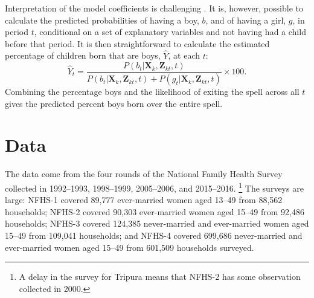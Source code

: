 \documentclass[12pt,letterpaper]{article}
\begin{document}
Interpretation of the model coefficients is challenging \citep{thomas96}.
It is, however, possible to calculate the predicted probabilities of 
having a boy, $b$, and of having a girl, $g$, in period $t$, conditional on 
a set of explanatory variables and not having had a child before that period.
It is then straightforward to calculate the estimated percentage of children born that 
are boys, $\hat{Y}$, at each $t$:  
\begin{equation}
\hat{Y}_t 
= 
\frac{ P(b_{t} | \mathbf{X}_{k}, \mathbf{Z}_{kt},t )}
{ P(b_{t} | \mathbf{X}_{k}, \mathbf{Z}_{kt},t) + P(g_{t} | \mathbf{X}_{k}, \mathbf{Z}_{kt},t )} 
\times 100.
\label{eq:probability_son}
\end{equation}
Combining the percentage boys and the likelihood of exiting the spell 
across all $t$ gives the predicted percent boys born over the entire spell.


\section{Data\label{sec:data}}

The data come from the four rounds of the National Family Health Survey
collected in 1992--1993, 1998--1999, 2005--2006, and 2015--2016.%
\footnote{
A delay in the survey for Tripura means that NFHS-2 has some observation 
collected in 2000.
}
The surveys are large: NFHS-1 covered 89,777 ever-married women 
aged 13--49 from 88,562 households;
NFHS-2 covered 90,303 ever-married women aged 15--49 from 92,486 households;
NFHS-3 covered 124,385 never-married and ever-married women aged 
15--49 from 109,041 households;
and 
NFHS-4 covered 699,686 never-married and ever-married women aged
15--49 from 601,509 households surveyed.
\end{document}
